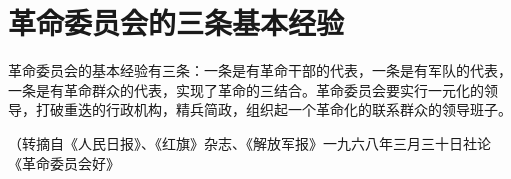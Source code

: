 \section{革命委员会的三条基本经验}

革命委员会的基本经验有三条：一条是有革命干部的代表，一条是有军队的代表，一条是有革命群众的代表，实现了革命的三结合。革命委员会要实行一元化的领导，打破重迭的行政机构，精兵简政，组织起一个革命化的联系群众的领导班子。
{\raggedleft （转摘自《人民日报》、《红旗》杂志、《解放军报》一九六八年三月三十日社论《革命委员会好》\par}